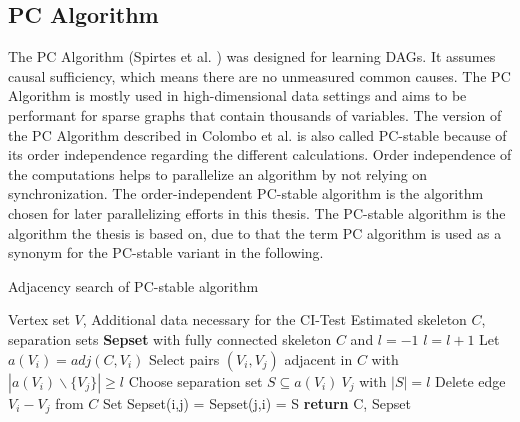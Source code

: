 \subsection{PC Algorithm}
The PC Algorithm (Spirtes et al. \cite{spirtesCausationPredictionSearch1993}) was designed for learning DAGs. It assumes causal sufficiency, which means there are no unmeasured common causes. The PC Algorithm is mostly used in high-dimensional data settings and aims to be performant for sparse graphs that contain thousands of variables. \cite{kalischUnderstandingHumanFunctioning2010}
The version of the PC Algorithm described in Colombo et al. \cite{colomboOrderIndependentConstraintBasedCausal} is also called PC-stable because of its order independence regarding the different calculations. Order independence of the computations helps to parallelize an algorithm by not relying on synchronization. The order-independent PC-stable algorithm is the algorithm chosen for later parallelizing efforts in this thesis. The PC-stable algorithm is the algorithm the thesis is based on, due to that the term PC algorithm is used as a synonym for the PC-stable variant in the following.

\begin{algorithm}
    \caption{Adjacency search of PC-stable algorithm \cite{colomboOrderIndependentConstraintBasedCausal}}
    \label{alg:pcstable}
    \begin{algorithmic}[1]
    \Require Vertex set $V$, Additional data necessary for the CI-Test
    \Ensure Estimated skeleton $C$, separation sets \textbf{Sepset}
    \State with fully connected skeleton $C$ and $l = -1$
    \Repeat 
        \State $l=l+1$
            \State Let $a(V_i) = adj(C,V_i)$
        \EndFor
        \Repeat
            \State Select pairs $(V_i,V_j)$ adjacent in $C$ with $|a(V_i)\backslash\{V_j\}| \geq l$
            \Repeat
                \State Choose separation set $S \subseteq a(V_i ) \ {V_j }$ with $| S | = l$
                    \State Delete edge $V_i - V_j$ from $C$
                    \State Set Sepset(i,j) = Sepset(j,i) = S
                \EndIf
    \State \textbf{return} C, Sepset
    \end{algorithmic}
\end{algorithm}

